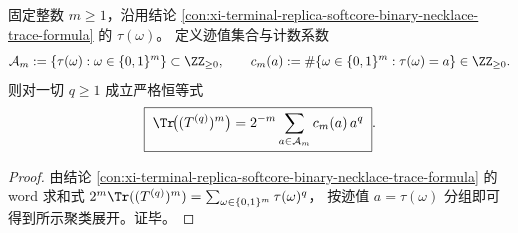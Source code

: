 \begin{conclusion}\label{con:xi-terminal-replica-softcore-trace-moment-clustered-exponential-sum}
固定整数 \(m\ge 1\)，沿用结论 \ref{con:xi-terminal-replica-softcore-binary-necklace-trace-formula} 的 \(\tau(\omega)\)。
定义迹值集合与计数系数
\[
\mathcal A_m:=\{\tau(\omega):\omega\in\{0,1\}^m\}\subset\ZZ_{\ge 0},
\qquad
c_m(a):=\#\{\omega\in\{0,1\}^m:\tau(\omega)=a\}\in\ZZ_{\ge 0}.
\]
则对一切 \(q\ge 1\) 成立严格恒等式
\[
\boxed{\;
\Tr\!\bigl((T^{(q)})^{m}\bigr)=2^{-m}\sum_{a\in\mathcal A_m}c_m(a)\,a^q\; } .
\]
\end{conclusion}
\begin{proof}
由结论 \ref{con:xi-terminal-replica-softcore-binary-necklace-trace-formula} 的 word 求和式
\(
2^{m}\Tr((T^{(q)})^{m})=\sum_{\omega\in\{0,1\}^m}\tau(\omega)^q
\)，
按迹值 \(a=\tau(\omega)\) 分组即可得到所示聚类展开。证毕。
\end{proof}


